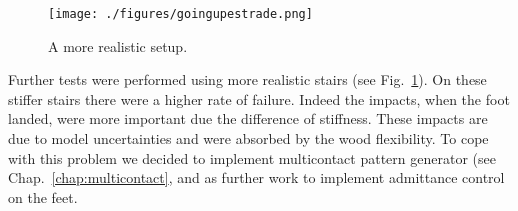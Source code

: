 \begin{figure}[ht]
  \begin{center}
    \texttt{[image: ./figures/goingupestrade.png]}
  \end{center}
  \caption{A more realistic setup.}
  \label{fig:new:stairs}
\end{figure}

Further tests were performed using more realistic stairs (see Fig.~\ref{fig:new:stairs}).
On these stiffer stairs there were a higher rate of failure.
Indeed the impacts, when the foot landed, were more important due the difference of stiffness.
These impacts are due to model uncertainties and were absorbed by the wood flexibility.
To cope with this problem we decided to implement multicontact pattern generator (see Chap.~\ref{chap:multicontact}, and as further work to implement admittance control on the feet.

